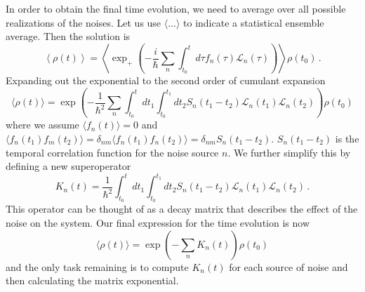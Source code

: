 In order to obtain the final time evolution, we need to average over all possible realizations of the noises.
Let us use $\langle...\rangle$ to indicate a statistical ensemble average.
Then the solution is
\begin{equation*}
    \left\langle\rho(t)\right\rangle=\left\langle\exp_+\left(-\frac{i}{\hbar}\sum_n\int_{t_0}^td\tau f_n(\tau)\mathcal{L}_n(\tau)\right)\right\rangle\rho(t_0) \,.
\end{equation*}
Expanding out the exponential to the second order of cumulant expansion
\begin{equation}
    \langle\rho(t)\rangle = \exp\left(-\frac{1}{\hbar^2}\sum_{n}\int_{t_0}^tdt_1\int_{t_0}^{t_1}dt_2 S_n(t_1-t_2)\mathcal{L}_n(t_1)\mathcal{L}_n(t_2)\right)\rho(t_0)
\end{equation}
where we assume $\langle f_n(t)\rangle = 0$ and $\langle f_n(t_1)f_m(t_2)\rangle=\delta_{nm}\langle f_n(t_1)f_n(t_2)\rangle = \delta_{nm}S_n(t_1-t_2)$.
$S_n(t_1-t_2)$ is the temporal correlation function for the noise source $n$.
We further simplify this by defining a new superoperator
\begin{equation}\label{EQ:decay_matrix}
    K_n(t) = \frac{1}{\hbar^2}\int_{t_0}^tdt_1\int_{t_0}^{t_1}dt_2 S_n(t_1-t_2)\mathcal{L}_n(t_1)\mathcal{L}_n(t_2) \,.
\end{equation}
This operator can be thought of as a decay matrix that describes the effect of the noise on the system.
Our final expression for the time evolution is now
\begin{equation}
    \langle\rho(t)\rangle = \exp\left(-\sum_n K_n(t)\right)\rho(t_0)
\end{equation}
and the only task remaining is to compute $K_n(t)$ for each source of noise and then calculating the matrix exponential.

